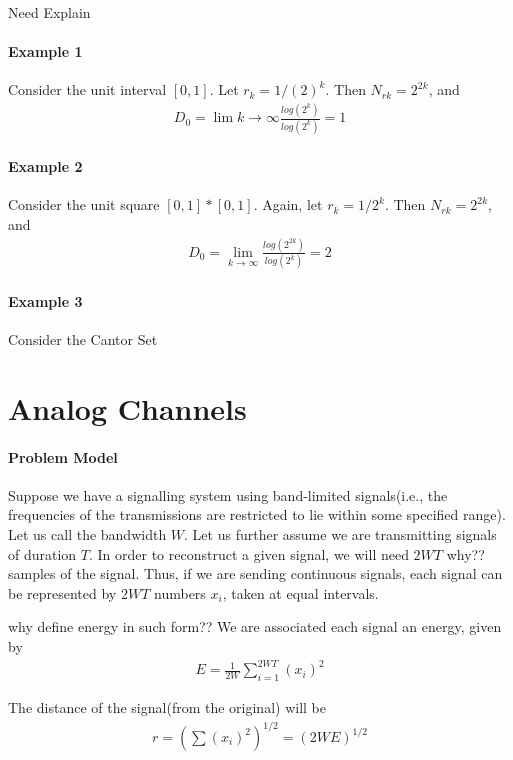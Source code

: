 \documentclass[10 pt,final]{article}
\newcommand{\impo}[1]{{\color{magenta} #1}}
\newcommand{\question}[1]{{\color{blue} #1}}
\begin{document}
\question{Need Explain}

\paragraph{Example 1} Consider the unit interval $[0,1]$. Let $r_k = 1/(2)^k$. Then $N_{rk} = 2^{2k}$, and
\begin{align*}
D_0 = \lim{k \to \infty} \frac{log(2^{k})}{log(2^k)} = 1
\end{align*}

\paragraph{Example 2} Consider the unit square $[0,1]*[0,1]$. Again, let $r_k = 1/2^k$. Then $N_{rk} = 2^{2k}$, and
\begin{align*}
D_0 = \lim_{k \to \infty} \frac{log(2^{2k})}{log(2^k)} = 2
\end{align*}

\paragraph{Example 3} Consider the \impo{Cantor Set} 
\section{Analog Channels}
\paragraph{Problem Model} Suppose we have a signalling system using \impo{band-limited} signals(i.e., the frequencies of the transmissions are restricted to lie within some specified range). Let us call the bandwidth $W$. Let us further assume we are transmitting signals of duration $T$. In order to reconstruct a given signal, we will need $2WT$\question{why??} samples of the signal. Thus, if we are sending continuous signals, each signal can be represented by $2WT$ numbers $x_i$, taken at equal intervals.

\question{why define energy in such form??}
We are associated each signal an energy, given by
\begin{align*}
E = \frac{1}{2W} \sum^{2WT}_{i=1} (x_i)^2
\end{align*}

The \impo{distance} of the signal(from the original) will be
\begin{align*}
r = (\sum (x_i)^2)^{1/2} = (2WE)^{1/2}
\end{align*}
\end{document}
